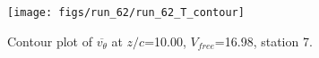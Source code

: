 \begin{figure}[H]
\centering
\texttt{[image: figs/run\_62/run\_62\_T\_contour]}
\caption{Contour plot of $\overline{v_{\theta}}$ at $z/c$=10.00, $V_{free}$=16.98, station 7.}
\label{fig:run_62_T_contour}
\end{figure}



